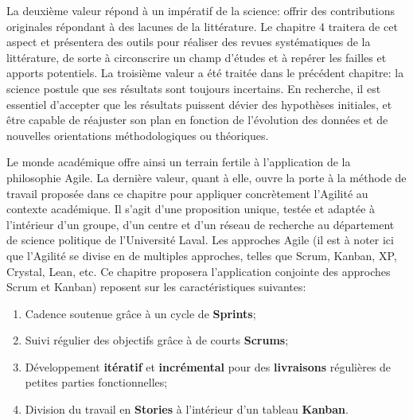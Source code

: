\documentclass[
  letterpaper,
  DIV=11,
  numbers=noendperiod]{scrreprt}
\providecommand{\tightlist}{%
  \setlength{\itemsep}{0pt}\setlength{\parskip}{0pt}}\usepackage{longtable,booktabs,array}
\begin{document}
La deuxième valeur répond à un impératif de la science: offrir des
contributions originales répondant à des lacunes de la littérature. Le
chapitre 4 traitera de cet aspect et présentera des outils pour réaliser
des revues systématiques de la littérature, de sorte à circonscrire un
champ d'études et à repérer les failles et apports potentiels. La
troisième valeur a été traitée dans le précédent chapitre: la science
postule que ses résultats sont toujours incertains. En recherche, il est
essentiel d'accepter que les résultats puissent dévier des hypothèses
initiales, et être capable de réajuster son plan en fonction de
l'évolution des données et de nouvelles orientations méthodologiques ou
théoriques.

Le monde académique offre ainsi un terrain fertile à l'application de la
philosophie Agile. La dernière valeur, quant à elle, ouvre la porte à la
méthode de travail proposée dans ce chapitre pour appliquer concrètement
l'Agilité au contexte académique. Il s'agit d'une proposition unique,
testée et adaptée à l'intérieur d'un groupe, d'un centre et d'un réseau
de recherche au département de science politique de l'Université Laval.
Les approches Agile (il est à noter ici que l'Agilité se divise en de
multiples approches, telles que Scrum, Kanban, XP, Crystal, Lean, etc.
Ce chapitre proposera l'application conjointe des approches Scrum et
Kanban) reposent sur les caractéristiques suivantes:

\begin{enumerate}
\def\labelenumi{\arabic{enumi}.}
\tightlist
\item
  Cadence soutenue grâce à un cycle de \textbf{Sprints};
\item
  Suivi régulier des objectifs grâce à de courts \textbf{Scrums};
\item
  Développement \textbf{itératif} et \textbf{incrémental} pour des
  \textbf{livraisons} régulières de petites parties fonctionnelles;
\item
  Division du travail en \textbf{Stories} à l'intérieur d'un tableau
  \textbf{Kanban}.
\end{enumerate}
\end{document}
